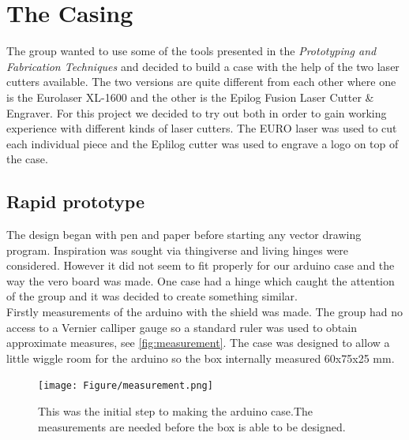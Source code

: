 \chapter{The Casing}
\label{the_casing}
The group wanted to use some of the tools presented in the \textit{Prototyping and Fabrication Techniques} and decided to build a case with the help of the two laser cutters available. The two versions are quite different from each other where one is the Eurolaser XL-1600 and the other is the Epilog Fusion Laser Cutter \& Engraver. For this project we decided to try out both in order to gain working experience with different kinds of laser cutters. The EURO laser was used to cut each individual piece and the Eplilog cutter was used to engrave a logo on top of the case.

\section{Rapid prototype}
The design began with pen and paper before starting any vector drawing program. Inspiration was sought via thingiverse and living hinges were considered. However it did not seem to fit properly for our arduino case and the way the vero board was made. One case had a hinge which caught the attention of the group and it was decided to create something similar.\\
Firstly measurements of the arduino with the shield was made. The group had no access to a Vernier calliper gauge so a standard ruler was used to obtain approximate measures, see \autoref{fig:measurement}. The case was designed to allow a little wiggle room for the arduino so the box internally measured 60x75x25 mm.

\begin{figure}[H]
\centering
\texttt{[image: Figure/measurement.png]}
\caption{This was the initial step to making the arduino case.The measurements are needed before the box is able to be designed.}
\label{fig:measurement}
\end{figure}




